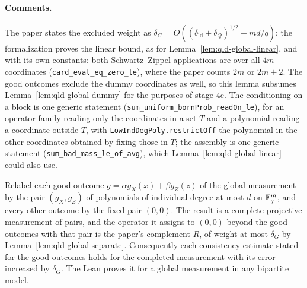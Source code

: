 \paragraph{Comments.} The paper states the excluded weight as
$\delta_G = O((\delta_{\mathrm{ld}} + \delta_Q)^{1/2} + md/q)$; the formalization proves the
linear bound, as for Lemma~\ref{lem:qld-global-linear}, and with its own constants: both
Schwartz--Zippel applications are over all $4m$ coordinates (\texttt{card\_eval\_eq\_zero\_le}),
where the paper counts $2m$ or $2m + 2$. The good outcomes exclude the dummy coordinates as well,
so this lemma subsumes Lemma~\ref{lem:qld-global-dummy} for the purposes of stage 4c. The
conditioning on a block is one generic statement (\texttt{sum\_uniform\_bornProb\_readOn\_le}),
for an operator family reading only the coordinates in a set $T$ and a polynomial reading a
coordinate outside $T$, with \texttt{LowIndDegPoly.restrictOff} the polynomial in the other
coordinates obtained by fixing those in $T$; the assembly is one generic statement
(\texttt{sum\_bad\_mass\_le\_of\_avg}), which Lemma~\ref{lem:qld-global-linear} could also use.

\begin{lemma}
\label{lem:qld-global-complete}
\leanok
Relabel each good outcome $g = \alpha g_X(x) + \beta g_Z(z)$ of the global measurement by the pair
$(g_X, g_Z)$ of polynomials of individual degree at most $d$ on $\mathbb{F}_q^m$, and every other outcome
by the fixed pair $(0, 0)$. The result is a complete projective measurement of pairs, and the
operator it assigns to $(0, 0)$ beyond the good outcomes with that pair is the paper's complement
$R$, of weight at most $\delta_G$ by Lemma~\ref{lem:qld-global-separate}. Consequently each
consistency estimate stated for the good outcomes holds for the completed measurement with its
error increased by $\delta_G$. The Lean proves it for a global measurement in any bipartite model.
\end{lemma}

